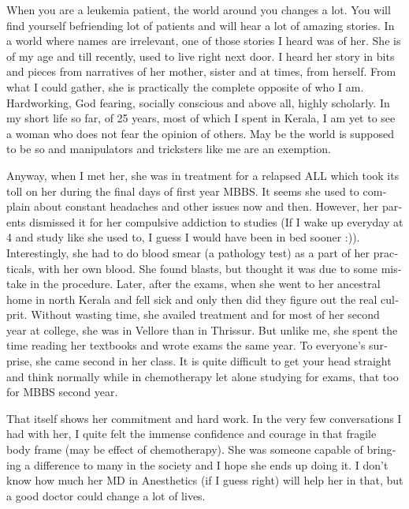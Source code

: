 \begin{english}
\vskip 2pt
When you are a leukemia patient, the world around you changes a lot. You will find yourself befriending lot of patients and will hear a lot of amazing stories. In a world where names are irrelevant, one of those stories I heard was of her. She is of my age and till recently, used to live right next door. I heard her story in bits and pieces from narratives of her mother, sister and at times, from herself. From what I could gather, she is practically the complete opposite of who I am. Hardworking, God fearing, socially conscious and above all, highly scholarly. In my short life so far, of 25 years, most of which I spent in Kerala, I am yet to see a woman who does not fear the opinion of others. May be the world is supposed to be so and manipulators and tricksters like me are an exemption.

Anyway, when I met her, she was in treatment for a relapsed ALL which took its toll on her during the final days of first year MBBS. It seems she used to complain about constant headaches and other issues now and then. However, her parents dismissed it for her compulsive addiction to studies (If I wake up everyday at 4 and study like she used to, I guess I would have been in bed sooner :)). Interestingly, she had to do blood smear (a pathology test) as a part of her practicals, with her own blood. She found blasts, but thought it was due to some mistake in the procedure. Later, after the exams, when she went to her ancestral home in north Kerala and fell sick and only then did they figure out the real culprit. Without wasting time, she availed treatment and for most of her second year at college, she was in Vellore than in Thrissur. But unlike me, she spent the time reading her textbooks and wrote exams the same year. To everyone's surprise, she came second in her class. It is quite difficult to get your head straight and think normally while in chemotherapy let alone studying for exams, that too for MBBS second year. 

That itself shows her commitment and hard work. In the very few conversations I had with her, I quite felt the immense confidence and courage in that fragile body frame (may be effect of chemotherapy). She was someone capable of bringing a difference to many in the society and I hope she ends up doing it. I don't know how much her MD in Anesthetics (if I guess right) will help her in that, but a good doctor could change a lot of lives. 


\end{english}
